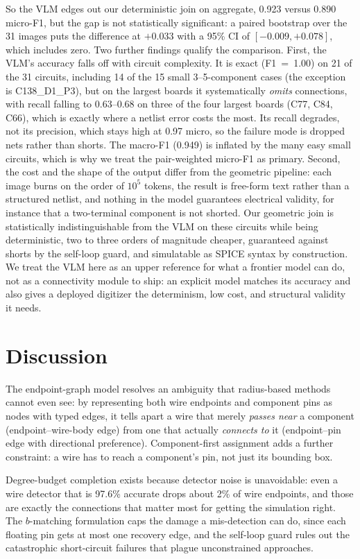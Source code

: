 \documentclass[journal]{IEEEtran}
\begin{document}
So the VLM edges out our deterministic join on aggregate, 0.923 versus 0.890 micro-F1, but the gap is not statistically significant: a paired bootstrap over the 31 images puts the difference at $+0.033$ with a 95\% CI of $[-0.009, +0.078]$, which includes zero. Two further findings qualify the comparison. First, the VLM's accuracy falls off with circuit complexity. It is exact (F1~=~1.00) on 21 of the 31 circuits, including 14 of the 15 small 3--5-component cases (the exception is C138\_D1\_P3), but on the largest boards it systematically \emph{omits} connections, with recall falling to 0.63--0.68 on three of the four largest boards (C77, C84, C66), which is exactly where a netlist error costs the most. Its recall degrades, not its precision, which stays high at 0.97 micro, so the failure mode is dropped nets rather than shorts. The macro-F1 (0.949) is inflated by the many easy small circuits, which is why we treat the pair-weighted micro-F1 as primary. Second, the cost and the shape of the output differ from the geometric pipeline: each image burns on the order of $10^5$ tokens, the result is free-form text rather than a structured netlist, and nothing in the model guarantees electrical validity, for instance that a two-terminal component is not shorted. Our geometric join is statistically indistinguishable from the VLM on these circuits while being deterministic, two to three orders of magnitude cheaper, guaranteed against shorts by the self-loop guard, and simulatable as SPICE syntax by construction. We treat the VLM here as an upper reference for what a frontier model can do, not as a connectivity module to ship: an explicit model matches its accuracy and also gives a deployed digitizer the determinism, low cost, and structural validity it needs.

\section{Discussion}

The endpoint-graph model resolves an ambiguity that radius-based methods cannot even see: by representing both wire endpoints and component pins as nodes with typed edges, it tells apart a wire that merely \emph{passes near} a component (endpoint--wire-body edge) from one that actually \emph{connects to} it (endpoint--pin edge with directional preference). Component-first assignment adds a further constraint: a wire has to reach a component's pin, not just its bounding box.

Degree-budget completion exists because detector noise is unavoidable: even a wire detector that is 97.6\% accurate drops about 2\% of wire endpoints, and those are exactly the connections that matter most for getting the simulation right. The $b$-matching formulation caps the damage a mis-detection can do, since each floating pin gets at most one recovery edge, and the self-loop guard rules out the catastrophic short-circuit failures that plague unconstrained approaches.
\end{document}
